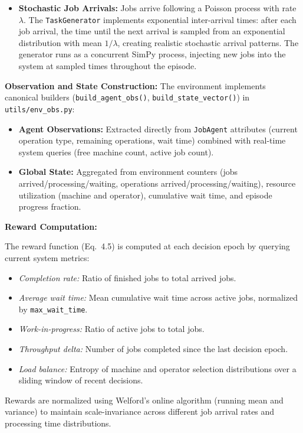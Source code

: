 \begin{itemize}
\item \textbf{Stochastic Job Arrivals:} Jobs arrive following a Poisson process with rate \(\lambda\). The \texttt{TaskGenerator} implements exponential inter-arrival times: after each job arrival, the time until the next arrival is sampled from an exponential distribution with mean \(1/\lambda\), creating realistic stochastic arrival patterns. The generator runs as a concurrent SimPy process, injecting new jobs into the system at sampled times throughout the episode.
\end{itemize}

\textbf{Observation and State Construction:}
The environment implements canonical builders (\texttt{build\_agent\_obs()}, \texttt{build\_state\_vector()}) in \texttt{utils/env\_obs.py}:
\begin{itemize}
    \item \textbf{Agent Observations:} Extracted directly from \texttt{JobAgent} attributes (current operation type, remaining operations, wait time) combined with real-time system queries (free machine count, active job count).
    \item \textbf{Global State:} Aggregated from environment counters (jobs arrived/processing/waiting, operations arrived/processing/waiting), resource utilization (machine and operator), cumulative wait time, and episode progress fraction.
\end{itemize}

\textbf{Reward Computation:}

The reward function (Eq.~4.5) is computed at each decision epoch by querying current system metrics:
\begin{itemize}
    \item \textit{Completion rate:} Ratio of finished jobs to total arrived jobs.
    \item \textit{Average wait time:} Mean cumulative wait time across active jobs, normalized by \texttt{max\_wait\_time}.
    \item \textit{Work-in-progress:} Ratio of active jobs to total jobs.
    \item \textit{Throughput delta:} Number of jobs completed since the last decision epoch.
    \item \textit{Load balance:} Entropy of machine and operator selection distributions over a sliding window of recent decisions.
\end{itemize}

Rewards are normalized using Welford's online algorithm (running mean and variance) to maintain scale-invariance across different job arrival rates and processing time distributions.

